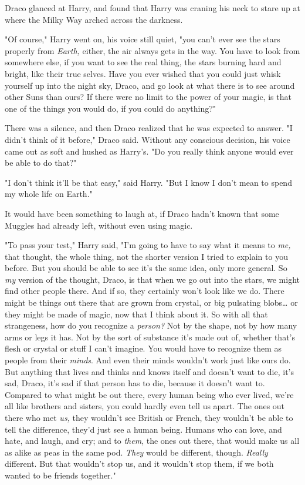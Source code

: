 Draco glanced at Harry, and found that Harry was craning his neck to stare up 
at where the Milky Way arched across the darkness.

"Of course," Harry went on, his voice still quiet, "you can't ever see the 
stars properly from \emph{Earth,} either, the air always gets in the way. You 
have to look from somewhere else, if you want to see the real thing, the stars 
burning hard and bright, like their true selves. Have you ever wished that you 
could just whisk yourself up into the night sky, Draco, and go look at what 
there is to see around other Suns than ours? If there were no limit to the 
power of your magic, is that one of the things you would do, if you could do 
anything?"

There was a silence, and then Draco realized that he was expected to answer. "I 
didn't think of it before," Draco said. Without any conscious decision, his 
voice came out as soft and hushed as Harry's. "Do you really think anyone would 
ever be able to do that?"

"I don't think it'll be that easy," said Harry. "But I know I don't mean to 
spend my whole life on Earth."

It would have been something to laugh at, if Draco hadn't known that some 
Muggles had already left, without even using magic.

"To pass your test," Harry said, "I'm going to have to say what it means to 
\emph{me,} that thought, the whole thing, not the shorter version I tried to 
explain to you before. But you should be able to see it's the same idea, only 
more general. So \emph{my} version of the thought, Draco, is that when we go 
out into the stars, we might find other people there. And if so, they certainly 
won't look like we do. There might be things out there that are grown from 
crystal, or big pulsating blobs{\ldots} or they might be made of magic, now 
that I think about it. So with all that strangeness, how do you recognize a 
\emph{person?} Not by the shape, not by how many arms or legs it has. Not by 
the sort of substance it's made out of, whether that's flesh or crystal or 
stuff I can't imagine. You would have to recognize them as people from their 
\emph{minds}. And even their minds wouldn't work just like ours do. But 
anything that lives and thinks and knows itself and doesn't want to die, it's 
sad, Draco, it's sad if that person has to die, because it doesn't want to. 
Compared to what might be out there, every human being who ever lived, we're 
all like brothers and sisters, you could hardly even tell us apart. The ones 
out there who met \emph{us,} they wouldn't see British or French, they wouldn't 
be able to tell the difference, they'd just see a human being. Humans who can 
love, and hate, and laugh, and cry; and to \emph{them}, the ones out there, 
that would make us all as alike as peas in the same pod. \emph{They} would be 
different, though. \emph{Really} different. But that wouldn't stop us, and it 
wouldn't stop them, if we both wanted to be friends together."

